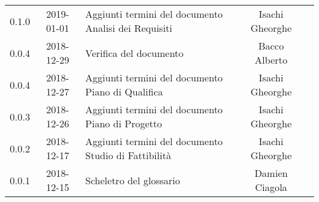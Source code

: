 {\begin{longtable}{ c c  C{4cm}  c  c }
		0.1.0 & 2019-01-01 & Aggiunti termini del documento Analisi dei Requisiti & Isachi Gheorghe &\reda{}\\
		
		0.0.4 & 2018-12-29 & Verifica del documento & Bacco Alberto & \ver{}\\
				
		0.0.4 & 2018-12-27 & Aggiunti termini del documento Piano di Qualifica & Isachi Gheorghe &\reda{}\\
				
		0.0.3 & 2018-12-26 &Aggiunti termini del documento Piano di Progetto & Isachi Gheorghe & \reda{}\\
				
		0.0.2 & 2018-12-17 & Aggiunti termini del documento Studio di Fattibilità & Isachi Gheorghe &\reda{}\\
		
		0.0.1 & 2018-12-15 & Scheletro del glossario & Damien Ciagola & \reda{}\\
		
	\end{longtable}

}